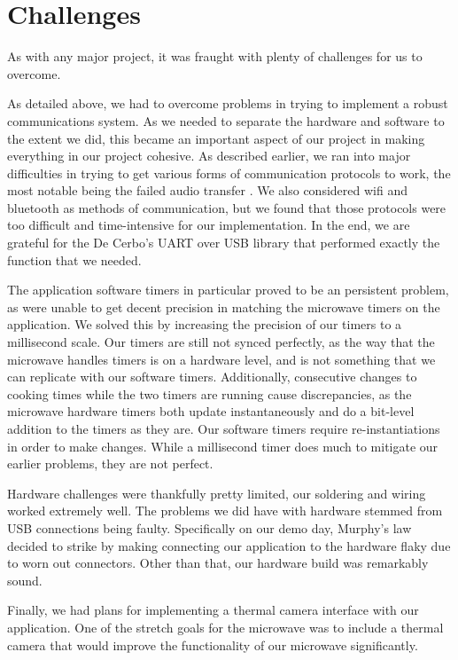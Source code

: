 \documentclass[10pt,journal,letterpaper,twocolumn]{IEEEtran}
\begin{document}
\section{Challenges}
As with any major project, it was fraught with plenty of challenges for us to overcome.  

As detailed above, we had to overcome problems in trying to implement a robust communications system.  As we needed to separate the hardware and software to the extent we did, this became an important aspect of our project in making everything in our project cohesive.  As described earlier, we ran into major difficulties in trying to get various forms of communication protocols to work, the most notable being the failed audio transfer \cite{audioDataTransfer}. We also considered wifi and bluetooth as methods of communication, but we found that those protocols were too difficult and time-intensive for our implementation.  In the end, we are grateful for the De Cerbo's UART over USB library that performed exactly the function that we needed.

The application software timers in particular proved to be an persistent problem, as were unable to get decent precision in matching the microwave timers on the application.  We solved this by increasing the precision of our timers to a millisecond scale.  Our timers are still not synced perfectly, as the way that the microwave handles timers is on a hardware level, and is not something that we can replicate with our software timers.  Additionally, consecutive changes to cooking times while the two timers are running cause discrepancies, as the microwave hardware timers both update instantaneously and do a bit-level addition to the timers as they are.  Our software timers require re-instantiations in order to make changes.  While a millisecond timer does much to mitigate our earlier problems, they are not perfect. 

Hardware challenges were thankfully pretty limited, our soldering and wiring worked extremely well.  The problems we did have with hardware stemmed from USB connections being faulty.  Specifically on our demo day, Murphy's law decided to strike by making connecting our application to the hardware flaky due to worn out connectors.  Other than that, our hardware build was remarkably sound.

Finally, we had plans for implementing a thermal camera interface with our application.  One of the stretch goals for the microwave was to include a thermal camera that would improve the functionality of our microwave significantly.
\end{document}
